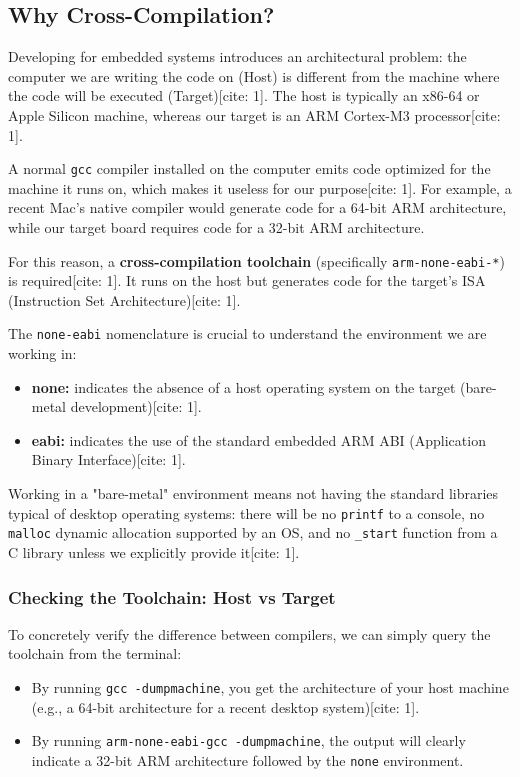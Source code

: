 
\subsection{Why Cross-Compilation?}
Developing for embedded systems introduces an architectural problem: the computer we are writing the code on (Host) is different from the machine where the code will be executed (Target)[cite: 1]. The host is typically an x86-64 or Apple Silicon machine, whereas our target is an ARM Cortex-M3 processor[cite: 1].

A normal \texttt{gcc} compiler installed on the computer emits code optimized for the machine it runs on, which makes it useless for our purpose[cite: 1]. For example, a recent Mac's native compiler would generate code for a 64-bit ARM architecture, while our target board requires code for a 32-bit ARM architecture.

For this reason, a \textbf{cross-compilation toolchain} (specifically \texttt{arm-none-eabi-*}) is required[cite: 1]. It runs on the host but generates code for the target's ISA (Instruction Set Architecture)[cite: 1].

The \texttt{none-eabi} nomenclature is crucial to understand the environment we are working in:
\begin{itemize}
    \item \textbf{none:} indicates the absence of a host operating system on the target (bare-metal development)[cite: 1].
    \item \textbf{eabi:} indicates the use of the standard embedded ARM ABI (Application Binary Interface)[cite: 1].
\end{itemize}

Working in a "bare-metal" environment means not having the standard libraries typical of desktop operating systems: there will be no \texttt{printf} to a console, no \texttt{malloc} dynamic allocation supported by an OS, and no \texttt{\_start} function from a C library unless we explicitly provide it[cite: 1].

\subsubsection{Checking the Toolchain: Host vs Target}
To concretely verify the difference between compilers, we can simply query the toolchain from the terminal:
\begin{itemize}
    \item By running \texttt{gcc -dumpmachine}, you get the architecture of your host machine (e.g., a 64-bit architecture for a recent desktop system)[cite: 1].
    \item By running \texttt{arm-none-eabi-gcc -dumpmachine}, the output will clearly indicate a 32-bit ARM architecture followed by the \texttt{none} environment.
\end{itemize}

